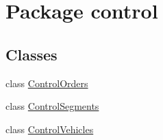 \hypertarget{namespacecontrol}{}\section{Package control}
\label{namespacecontrol}
\subsection*{Classes}
\begin{DoxyCompactItemize}
\item 
class \mbox{\hyperlink{classcontrol_1_1_control_orders}{Control\+Orders}}
\item 
class \mbox{\hyperlink{classcontrol_1_1_control_segments}{Control\+Segments}}
\item 
class \mbox{\hyperlink{classcontrol_1_1_control_vehicles}{Control\+Vehicles}}
\end{DoxyCompactItemize}
